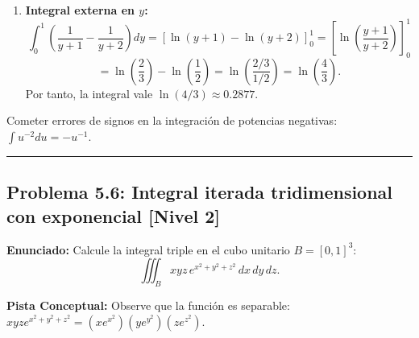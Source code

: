 \documentclass[11pt,a4paper]{article}
\begin{document}
\begin{enumerate}[label=\textbf{\arabic*.}]
\item \textbf{Integral externa en $y$:}
\begin{equation*}
\int_0^1 \left( \frac{1}{y + 1} - \frac{1}{y + 2} \right) dy = [\ln(y + 1) - \ln(y + 2)]_0^1 = \left[ \ln\left(\frac{y+1}{y+2}\right) \right]_0^1
\end{equation*}
\begin{equation*}
= \ln\left(\frac{2}{3}\right) - \ln\left(\frac{1}{2}\right) = \ln\left(\frac{2/3}{1/2}\right) = \ln\left(\frac{4}{3}\right).
\end{equation*}
Por tanto, la integral vale $\ln(4/3) \approx 0.2877$.
\end{enumerate}

\begin{trapbox}
Cometer errores de signos en la integración de potencias negativas: $\int u^{-2} du = -u^{-1}$.
\end{trapbox}

\vspace{0.5cm}
\hrule
\vspace{0.5cm}

\subsection*{Problema 5.6: Integral iterada tridimensional con exponencial \hfill \color{primaryblue}\small[Nivel 2]}

\begin{tcolorbox}[colback=white,colframe=gray!40,arc=1mm,boxrule=0.5pt,left=3mm,right=3mm,top=2mm,bottom=2mm]
\textbf{Enunciado:} Calcule la integral triple en el cubo unitario $B = [0, 1]^3$:
\begin{equation*}
\iiint_B x y z \, e^{x^2 + y^2 + z^2} \, dx \, dy \, dz.
\end{equation*}
\end{tcolorbox}

\begin{tcolorbox}[colback=yellow!4,colframe=accentamber!70,arc=1mm,boxrule=0.5pt,left=3mm,right=3mm,top=1.5mm,bottom=1.5mm]
\textbf{Pista Conceptual:} Observe que la función es separable: $x y z e^{x^2+y^2+z^2} = (x e^{x^2})(y e^{y^2})(z e^{z^2})$.
\end{tcolorbox}
\end{document}
